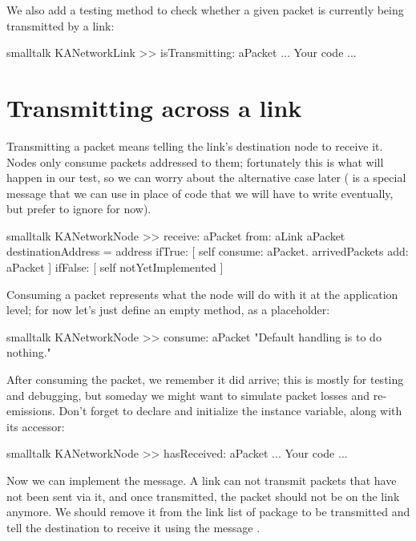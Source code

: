 \documentclass[10pt,twoside,english]{_support/latex/sbabook/sbabook}
\begin{document}
We also add a testing method to check whether a given packet is currently being transmitted by a link:

\begin{displaycode}{smalltalk}
KANetworkLink >> isTransmitting: aPacket
    ... Your code ...
\end{displaycode}
\section{Transmitting across a link}
Transmitting a packet means telling the link's destination node to receive it. Nodes only consume packets addressed to them; fortunately this is what will happen in our test, so we can worry about the alternative case later ( is a special message that we can use in place of code that we will have to write eventually, but prefer to ignore for now).

\begin{displaycode}{smalltalk}
KANetworkNode >> receive: aPacket from: aLink
    aPacket destinationAddress = address
        ifTrue: [
            self consume: aPacket.
            arrivedPackets add: aPacket ]
        ifFalse: [ self notYetImplemented ]
\end{displaycode}

Consuming a packet represents what the node will do with it at the application level; for now let's just define an empty  method, as a placeholder:

\begin{displaycode}{smalltalk}
KANetworkNode >> consume: aPacket
    "Default handling is to do nothing."
\end{displaycode}

After consuming the packet, we remember it did arrive; this is mostly for testing and debugging, but someday we might want to simulate packet losses and re-emissions.
Don't forget to declare and initialize the  instance variable, along with its accessor:

\begin{displaycode}{smalltalk}
KANetworkNode >> hasReceived: aPacket
	... Your code ...
\end{displaycode}

Now we can implement the  message. A link can not transmit packets that have not been sent via it, and once transmitted, the packet should not be on the link anymore. We should remove it from the link list of package to be transmitted
and tell the destination to receive it using the message .
\end{document}
